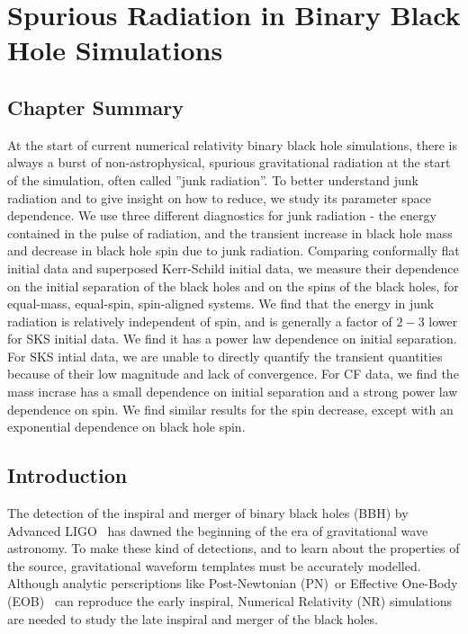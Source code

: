 
\chapter[Spurious Radiation in BBH Simulations]{Spurious Radiation in Binary Black Hole Simulations}
\label{chap:jr}

\section{Chapter Summary}
At the start of current numerical relativity binary black hole simulations, there is always a burst of non-astrophysical, spurious gravitational radiation at the start of the simulation, often called ''junk radiation''. To better understand junk radiation and to give insight on how to reduce, we study its parameter space dependence. We use three different diagnostics for junk radiation - the energy contained in the pulse of radiation, and the transient increase in black hole mass and decrease in black hole spin due to junk radiation. Comparing conformally flat initial data and superposed Kerr-Schild initial data, we measure their dependence on the initial separation of the black holes and on the spins of the black holes, for equal-mass, equal-spin, spin-aligned systems. We find that the energy in junk radiation is relatively independent of spin, and is generally a factor of $2-3$ lower for SKS initial data. We find it has a power law dependence on initial separation. For SKS intial data, we are unable to directly quantify the transient quantities because of their low magnitude and lack of convergence. For CF data, we find the mass incrase has a small dependence on initial separation and a strong power law dependence on spin. We find similar results for the spin decrease, except with an exponential dependence on black hole spin.

\section{Introduction}
The detection of the inspiral and merger of binary black holes (BBH) by
Advanced
LIGO~\citep{Abbott:2016nmj,LIGOVirgo2016a} has
dawned the beginning of the era of gravitational wave astronomy. To
make these kind of detections, and to learn about the properties of
the source, gravitational waveform templates must be accurately
modelled. Although analytic perscriptions like Post-Newtonian (PN)~\citep{Blanchet2006}or Effective One-Body (EOB)~\citep{Buonanno99} can reproduce the early inspiral,
Numerical Relativity (NR) simulations are needed to study
the late inspiral and merger of the black holes.

